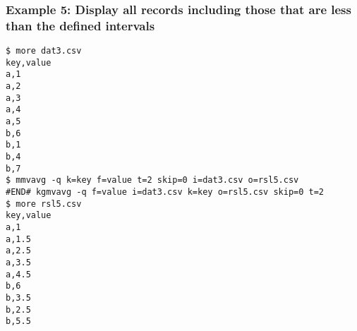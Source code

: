 \subsubsection*{Example 5: Display all records including those that are less than the defined intervals }



\begin{Verbatim}[baselinestretch=0.7,frame=single]
$ more dat3.csv
key,value
a,1
a,2
a,3
a,4
a,5
b,6
b,1
b,4
b,7
$ mmvavg -q k=key f=value t=2 skip=0 i=dat3.csv o=rsl5.csv
#END# kgmvavg -q f=value i=dat3.csv k=key o=rsl5.csv skip=0 t=2
$ more rsl5.csv
key,value
a,1
a,1.5
a,2.5
a,3.5
a,4.5
b,6
b,3.5
b,2.5
b,5.5
\end{Verbatim}
